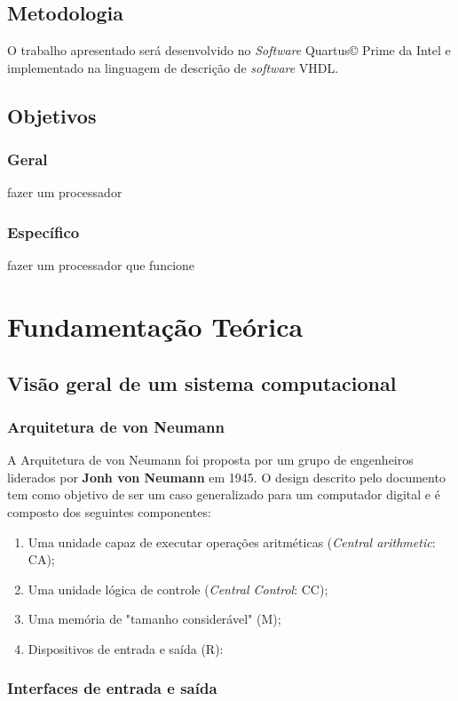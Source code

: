 \documentclass[
	12pt,				  %
	openright,		%
	a4paper,			%
	english,			%
	french,				%
	spanish,			%
	brazil,				%
]{abntex2}
\begin{document}
\section{Metodologia}
O trabalho apresentado será desenvolvido no \emph{Software} Quartus\copyright
Prime da Intel e implementado na linguagem de descrição de
\emph{software} VHDL.

\section{Objetivos}
\subsection*{Geral}
fazer um processador
\subsection*{Específico}
fazer um processador que funcione

\chapter{Fundamentação Teórica}

\section{Visão geral de um sistema computacional}
\subsection{Arquitetura de von Neumann}

A Arquitetura de von Neumann foi proposta por um grupo de engenheiros liderados
por \textbf{Jonh von Neumann} em 1945. O design descrito pelo documento tem como
objetivo de ser um caso generalizado para um computador digital e é composto
dos seguintes componentes:
\begin{enumerate}
	\item Uma unidade capaz de executar operações aritméticas (\emph{Central
		      arithmetic}: CA);
	\item Uma unidade lógica de controle (\emph{Central Control}: CC);
	\item Uma memória de "tamanho considerável" (M);
	\item Dispositivos de entrada e saída (R):
\end{enumerate}
\subsection{Interfaces de entrada e saída}
\end{document}
